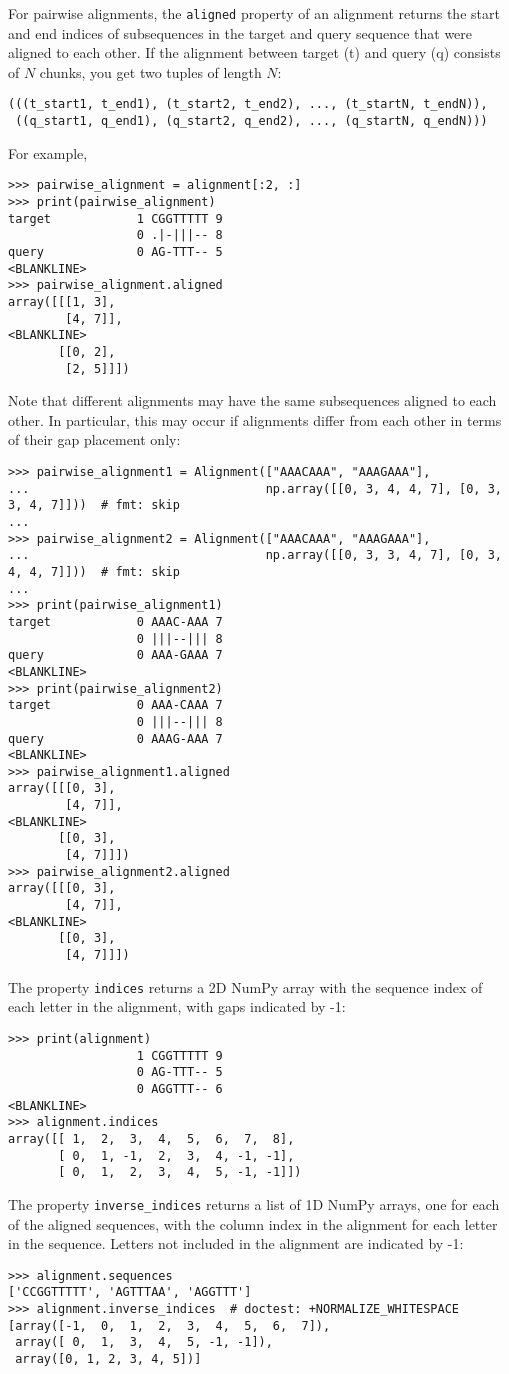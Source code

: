 For pairwise alignments, the \verb|aligned| property of an alignment returns the start and end indices of subsequences in the target and query sequence that were aligned to each other.  If the alignment between target (t) and query (q) consists of $N$ chunks, you get two tuples of length $N$:
\begin{verbatim}
(((t_start1, t_end1), (t_start2, t_end2), ..., (t_startN, t_endN)),
 ((q_start1, q_end1), (q_start2, q_end2), ..., (q_startN, q_endN)))
\end{verbatim}
For example,
\begin{verbatim}
>>> pairwise_alignment = alignment[:2, :]
>>> print(pairwise_alignment)
target            1 CGGTTTTT 9
                  0 .|-|||-- 8
query             0 AG-TTT-- 5
<BLANKLINE>
>>> pairwise_alignment.aligned
array([[[1, 3],
        [4, 7]],
<BLANKLINE>
       [[0, 2],
        [2, 5]]])
\end{verbatim}
Note that different alignments may have the same subsequences aligned to each other. In particular, this may occur if alignments differ from each other in terms of their gap placement only:
\begin{verbatim}
>>> pairwise_alignment1 = Alignment(["AAACAAA", "AAAGAAA"],
...                                 np.array([[0, 3, 4, 4, 7], [0, 3, 3, 4, 7]]))  # fmt: skip
...
>>> pairwise_alignment2 = Alignment(["AAACAAA", "AAAGAAA"],
...                                 np.array([[0, 3, 3, 4, 7], [0, 3, 4, 4, 7]]))  # fmt: skip
...
>>> print(pairwise_alignment1)
target            0 AAAC-AAA 7
                  0 |||--||| 8
query             0 AAA-GAAA 7
<BLANKLINE>
>>> print(pairwise_alignment2)
target            0 AAA-CAAA 7
                  0 |||--||| 8
query             0 AAAG-AAA 7
<BLANKLINE>
>>> pairwise_alignment1.aligned
array([[[0, 3],
        [4, 7]],
<BLANKLINE>
       [[0, 3],
        [4, 7]]])
>>> pairwise_alignment2.aligned
array([[[0, 3],
        [4, 7]],
<BLANKLINE>
       [[0, 3],
        [4, 7]]])
\end{verbatim}

The property \verb|indices| returns a 2D NumPy array with the sequence index of each letter in the alignment, with gaps indicated by -1:
\begin{verbatim}
>>> print(alignment)
                  1 CGGTTTTT 9
                  0 AG-TTT-- 5
                  0 AGGTTT-- 6
<BLANKLINE>
>>> alignment.indices
array([[ 1,  2,  3,  4,  5,  6,  7,  8],
       [ 0,  1, -1,  2,  3,  4, -1, -1],
       [ 0,  1,  2,  3,  4,  5, -1, -1]])
\end{verbatim}
The property \verb|inverse_indices| returns a list of 1D NumPy arrays, one for each of the aligned sequences, with the column index in the alignment for each letter in the sequence. Letters not included in the alignment are indicated by -1:
\begin{verbatim}
>>> alignment.sequences
['CCGGTTTTT', 'AGTTTAA', 'AGGTTT']
>>> alignment.inverse_indices  # doctest: +NORMALIZE_WHITESPACE
[array([-1,  0,  1,  2,  3,  4,  5,  6,  7]),
 array([ 0,  1,  3,  4,  5, -1, -1]),
 array([0, 1, 2, 3, 4, 5])]
\end{verbatim}

